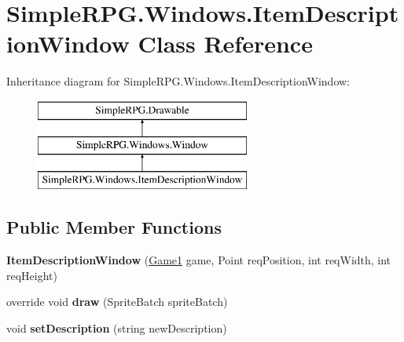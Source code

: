 \hypertarget{class_simple_r_p_g_1_1_windows_1_1_item_description_window}{\section{Simple\-R\-P\-G.\-Windows.\-Item\-Description\-Window Class Reference}
\label{class_simple_r_p_g_1_1_windows_1_1_item_description_window}
}
Inheritance diagram for Simple\-R\-P\-G.\-Windows.\-Item\-Description\-Window\-:\begin{figure}[H]
\begin{center}
\leavevmode
\includegraphics[height=3.000000cm]{class_simple_r_p_g_1_1_windows_1_1_item_description_window}
\end{center}
\end{figure}
\subsection*{Public Member Functions}
\begin{DoxyCompactItemize}
\item 
\hypertarget{class_simple_r_p_g_1_1_windows_1_1_item_description_window_a632484e7c47d19555b68a43c7ef314b1}{{\bfseries Item\-Description\-Window} (\hyperlink{class_simple_r_p_g_1_1_game1}{Game1} game, Point req\-Position, int req\-Width, int req\-Height)}\label{class_simple_r_p_g_1_1_windows_1_1_item_description_window_a632484e7c47d19555b68a43c7ef314b1}

\item 
\hypertarget{class_simple_r_p_g_1_1_windows_1_1_item_description_window_a5346e4574e7a29a3a09cbde41e523fbe}{override void {\bfseries draw} (Sprite\-Batch sprite\-Batch)}\label{class_simple_r_p_g_1_1_windows_1_1_item_description_window_a5346e4574e7a29a3a09cbde41e523fbe}

\item 
\hypertarget{class_simple_r_p_g_1_1_windows_1_1_item_description_window_aec5da8cb493b5960a6cda6d5ec10610d}{void {\bfseries set\-Description} (string new\-Description)}\label{class_simple_r_p_g_1_1_windows_1_1_item_description_window_aec5da8cb493b5960a6cda6d5ec10610d}

\end{DoxyCompactItemize}
